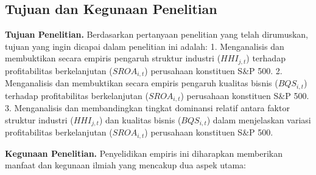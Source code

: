 \documentclass[12pt,a4paper]{article}
\begin{document}
\subsection{Tujuan dan Kegunaan
Penelitian}\label{tujuan-dan-kegunaan-penelitian}

\textbf{Tujuan Penelitian.} Berdasarkan pertanyaan penelitian yang telah
dirumuskan, tujuan yang ingin dicapai dalam penelitian ini adalah: 1.
Menganalisis dan membuktikan secara empiris pengaruh struktur industri
(\(HHI_{j,t}\)) terhadap profitabilitas berkelanjutan (\(SROA_{i,t}\))
perusahaan konstituen S\&P 500. 2. Menganalisis dan membuktikan secara
empiris pengaruh kualitas bisnis (\(BQS_{i,t}\)) terhadap profitabilitas
berkelanjutan (\(SROA_{i,t}\)) perusahaan konstituen S\&P 500. 3.
Menganalisis dan membandingkan tingkat dominansi relatif antara faktor
struktur industri (\(HHI_{j,t}\)) dan kualitas bisnis (\(BQS_{i,t}\))
dalam menjelaskan variasi profitabilitas berkelanjutan (\(SROA_{i,t}\))
perusahaan konstituen S\&P 500.

\textbf{Kegunaan Penelitian.} Penyelidikan empiris ini diharapkan
memberikan manfaat dan kegunaan ilmiah yang mencakup dua aspek utama:
\end{document}
